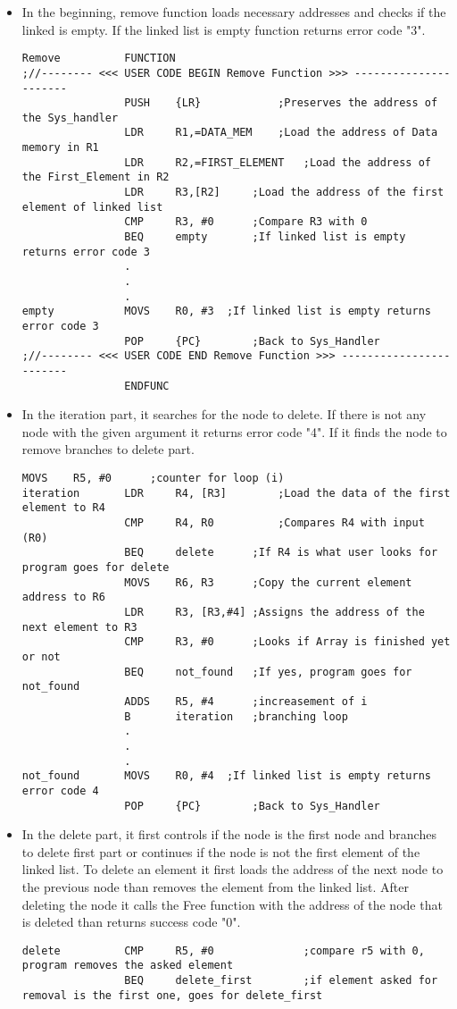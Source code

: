 \documentclass[pdftex,12pt,a4paper]{article}
\begin{document}
\begin{itemize}
    \item In the beginning, remove function loads necessary addresses and checks if the linked is empty. If the linked list is empty function returns error code "3".
    \begin{lstlisting}[caption=Beginning, style=customasm]
Remove			FUNCTION			
;//-------- <<< USER CODE BEGIN Remove Function >>> ----------------------															
				PUSH	{LR}			;Preserves the address of the Sys_handler
				LDR 	R1,=DATA_MEM	;Load the address of Data memory in R1
				LDR 	R2,=FIRST_ELEMENT	;Load the address of the First_Element in R2
				LDR 	R3,[R2]		;Load the address of the first element of linked list
				CMP		R3, #0		;Compare R3 with 0
				BEQ		empty		;If linked list is empty returns error code 3
				.
				.
				.
empty			MOVS	R0, #3	;If linked list is empty returns error code 3	
				POP		{PC}		;Back to Sys_Handler
;//-------- <<< USER CODE END Remove Function >>> ------------------------				
				ENDFUNC
    \end{lstlisting}
    
    \item In the iteration part, it searches for the node to delete. If there is not any node with the given argument it returns error code "4". If it finds the node to remove branches to delete part.
    \begin{lstlisting}[caption=Iteration, style=customasm]
				MOVS 	R5, #0		;counter for loop (i)
iteration		LDR		R4, [R3]		;Load the data of the first element to R4
				CMP		R4, R0			;Compares R4 with input (R0)
				BEQ		delete		;If R4 is what user looks for program goes for delete
				MOVS 	R6, R3		;Copy the current element address to R6
				LDR		R3, [R3,#4]	;Assigns the address of the next element to R3
				CMP		R3, #0		;Looks if Array is finished yet or not
				BEQ		not_found	;If yes, program goes for not_found
				ADDS	R5, #4		;increasement of i
				B		iteration	;branching loop
				.
				.
				.
not_found		MOVS	R0, #4	;If linked list is empty returns error code 4	
				POP		{PC}		;Back to Sys_Handler

    \end{lstlisting}
    
    \item In the delete part, it first controls if the node is the first node and branches to delete first part or continues if the node is not the first element of the linked list. To delete an element it first loads the address of the next node to the previous node than removes the element from the linked list. After deleting the node it calls the Free function with the address of the node that is deleted than returns success code "0".
    \begin{lstlisting}[caption=Delete, style=customasm]
delete			CMP 	R5, #0				;compare r5 with 0, program removes the asked element
				BEQ		delete_first		;if element asked for removal is the first one, goes for delete_first	
				

\end{lstlisting}
\end{itemize}
\end{document}
